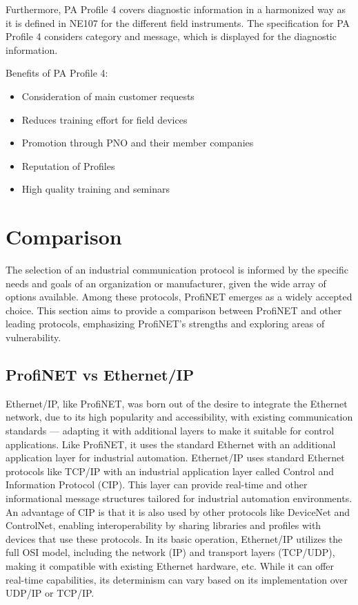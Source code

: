 \documentclass[conference]{IEEEtran}
\begin{document}
Furthermore, PA Profile 4 covers diagnostic information in a harmonized way as it is defined in NE107 for the different field instruments. The specification for PA Profile 4 considers category and message, which is displayed for the diagnostic information. 

Benefits of PA Profile 4:
\begin{itemize}
    \item Consideration of main customer requests
    \item Reduces training effort for field devices
    \item Promotion through PNO and their member companies
    \item Reputation of Profiles
    \item High quality training and seminars
\end{itemize}


\section{Comparison}
The selection of an industrial communication protocol is informed by the specific needs and goals of an organization or manufacturer, given the wide array of options available. Among these protocols, ProfiNET emerges as a widely accepted choice. This section aims to provide a comparison between ProfiNET and other leading protocols, emphasizing ProfiNET's strengths and exploring areas of vulnerability. 

\subsection{ProfiNET vs Ethernet/IP}
Ethernet/IP, like ProfiNET, was born out of the desire to integrate the Ethernet network, due to its high popularity and accessibility, with existing communication standards — adapting it with additional layers to make it suitable for control applications. Like ProfiNET, it uses the standard Ethernet with an additional application layer for industrial automation. Ethernet/IP uses standard Ethernet protocols like TCP/IP with an industrial application layer called Control and Information Protocol (CIP). This layer can provide real-time and other informational message structures tailored for industrial automation environments. An advantage of CIP is that it is also used by other protocols like DeviceNet and ControlNet, enabling interoperability by sharing libraries and profiles with devices that use these protocols\cite{Acromag2020EthernetIP}. In its basic operation, Ethernet/IP utilizes the full OSI model, including the network (IP) and transport layers (TCP/UDP), making it compatible with existing Ethernet hardware, etc. While it can offer real-time capabilities, its determinism can vary based on its implementation over UDP/IP or TCP/IP.
\end{document}
